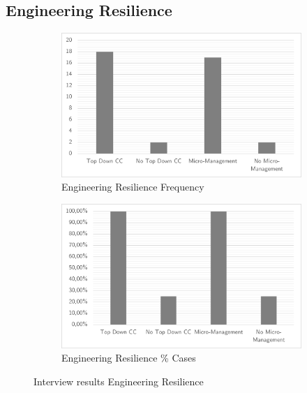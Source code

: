 \subsection{Engineering Resilience}
\begin{figure}[H]
	\centering
	\begin{subfigure}[H]{0.5\textwidth}
		\centering
		\includegraphics[width=0.95\linewidth]{images/engineeringresilience_frequency}
		\caption{Engineering Resilience Frequency}
		\label{fig:engineeringresiliencefrequency}
	\end{subfigure}%
	\begin{subfigure}[H]{0.5\textwidth}
		\centering
		\includegraphics[width=0.95\linewidth]{images/engineeringresilience_cases}
		\caption{Engineering Resilience \% Cases}
		\label{fig:engineeringresiliencecases}
	\end{subfigure}
	\caption{Interview results Engineering Resilience}
	\label{fig:interviewresultsengineeringresilience}
\end{figure}

